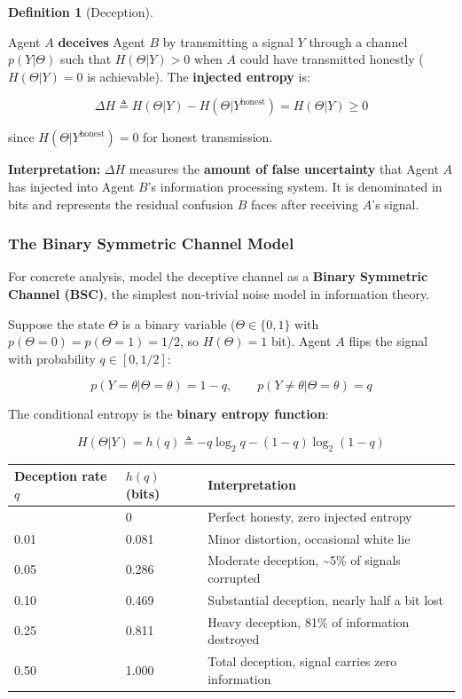 \documentclass[11pt]{article}
\theoremstyle{plain}
\theoremstyle{definition}
\newtheorem{definition}{Definition}
\theoremstyle{remark}
\newcounter{none}
\let\origsubsubsection\subsubsection
\renewcommand{\subsubsection}{\needspace{4\baselineskip}\origsubsubsection}
\begin{document}
\begin{definition}[Deception]
\label{def-deception}

Agent $A$ \textbf{deceives} Agent $B$ by transmitting a signal $Y$ through a channel $p(Y | \Theta)$ such that $H(\Theta | Y) > 0$ when $A$ could have transmitted honestly ($H(\Theta | Y) = 0$ is achievable). The \textbf{injected entropy} is:

$$\Delta H \triangleq H(\Theta | Y) - H(\Theta | Y^{\text{honest}}) = H(\Theta | Y) \geq 0$$

since $H(\Theta | Y^{\text{honest}}) = 0$ for honest transmission.
\end{definition}

\textbf{Interpretation:} \(\Delta H\) measures the \textbf{amount of
false uncertainty} that Agent \(A\) has injected into Agent \(B\)'s
information processing system. It is denominated in bits and represents
the residual confusion \(B\) faces after receiving \(A\)'s signal.

\subsubsection{The Binary Symmetric Channel
Model}\label{the-binary-symmetric-channel-model}

For concrete analysis, model the deceptive channel as a \textbf{Binary
Symmetric Channel (BSC)}, the simplest non-trivial noise model in
information theory.

Suppose the state \(\Theta\) is a binary variable
(\(\Theta \in \{0, 1\}\) with \(p(\Theta = 0) = p(\Theta = 1) = 1/2\),
so \(H(\Theta) = 1\) bit). Agent \(A\) flips the signal with probability
\(q \in [0, 1/2]\):

\[p(Y = \theta | \Theta = \theta) = 1 - q, \qquad p(Y \neq \theta | \Theta = \theta) = q\]

The conditional entropy is the \textbf{binary entropy function}:

\[H(\Theta | Y) = h(q) \triangleq -q \log_2 q - (1 - q) \log_2(1 - q)\]

{\def\LTcaptype{none} %
\begin{longtable}[]{@{}lll@{}}
\toprule\noalign{}
Deception rate \(q\) & \(h(q)\) (bits) & Interpretation \\
\midrule\noalign{}
\endhead
\bottomrule\noalign{}
\endlastfoot
0 & 0 & Perfect honesty, zero injected entropy \\
0.01 & 0.081 & Minor distortion, occasional white lie \\
0.05 & 0.286 & Moderate deception, \textasciitilde5\% of signals
corrupted \\
0.10 & 0.469 & Substantial deception, nearly half a bit lost \\
0.25 & 0.811 & Heavy deception, 81\% of information destroyed \\
0.50 & 1.000 & Total deception, signal carries zero information \\
\end{longtable}
}
\end{document}

